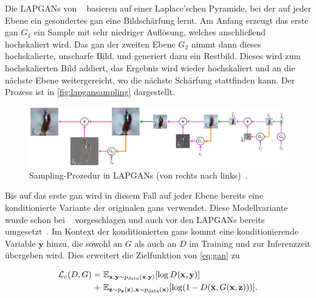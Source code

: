 Die LAPGANs von \citeauthor{Denton.2015}~\cite{Denton.2015} basieren auf einer Laplace'schen Pyramide, bei der auf jeder Ebene ein gesondertes \gls{gan} eine Bildschärfung lernt.
Am Anfang erzeugt das erste \gls{gan} $ G_1 $ ein Sample mit sehr niedriger Auflösung, welches anschließend hochskaliert wird.
Das \gls{gan} der zweiten Ebene $ G_2 $ nimmt dann dieses hochskalierte, unscharfe Bild, und generiert dazu ein Restbild.
Dieses wird zum hochskalierten Bild addiert, das Ergebnis wird wieder hochskaliert und an die nächste Ebene weitergereicht, wo die nächste Schärfung stattfinden kann.
Der Prozess ist in \autoref{fig:lapgansampling} dargestellt.

\begin{figure}
	\centering
	\includegraphics[width=0.9\linewidth]{img/lapgan_sampling}
	\caption{Sampling-Prozedur in LAPGANs (von rechts nach links)~\cite{Denton.2015}.}
	\label{fig:lapgansampling}
\end{figure}

Bis auf das erste \gls{gan} wird in diesem Fall auf jeder Ebene bereits eine konditionierte Variante der originalen \glspl{gan} verwendet.
Diese Modellvariante wurde schon bei \citeauthor{Goodfellow.2014}~\cite{Goodfellow.2014} vorgeschlagen und auch vor den LAPGANs bereits umgesetzt~\cite{Gauthier.2014,Mirza.2014}.
Im Kontext der konditionierten \glspl{gan} kommt eine konditionierende Variable $ \mathbf{y} $ hinzu, die sowohl an $ G $ als auch an $ D $ im Training und zur Inferenzzeit übergeben wird.
Dies erweitert die Zielfunktion von \autoref{eq:gan} zu

\begin{equation}\label{eq:canloss}
\begin{split}
\mathcal{L}_c(D, G) = & \ \mathbb{E}_{\mathbf{x}, \mathbf{y} \sim p_{\textup{data}}(\mathbf{x}, \mathbf{y})} [\log D(\mathbf{x}, \mathbf{y})] \\
+ & \ \mathbb{E}_{\mathbf{z} \sim p_{\mathbf{z}}(\mathbf{z}), \mathbf{x} \sim p_{\textup{data}}(\mathbf{x})} [\log(1 - D(\mathbf{x}, G(\mathbf{x}, \mathbf{z})))].
\end{split}
\end{equation}



